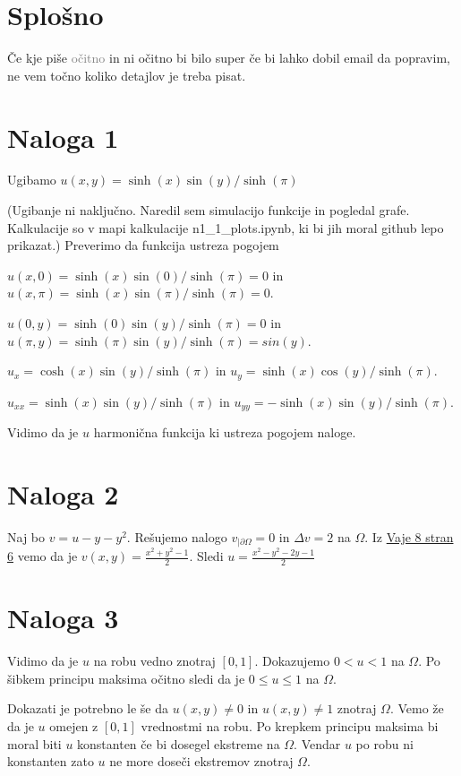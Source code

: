 \documentclass[12pt]{article}
\begin{document}
\section{Splošno}
Če kje piše \textcolor{gray}{očitno} in ni očitno bi bilo super če bi lahko dobil email da popravim, ne vem točno koliko detajlov je treba pisat.


\section{Naloga 1}
Ugibamo $u(x,y) = \sinh(x)\sin(y)/\sinh(\pi )$ 

(Ugibanje ni naključno. Naredil sem simulacijo funkcije in pogledal grafe. Kalkulacije so v mapi kalkulacije n1\_1\_plots.ipynb, ki bi jih moral github lepo prikazat.)
Preverimo da funkcija ustreza pogojem


$u(x,0) = \sinh(x)\sin(0)/\sinh(\pi ) = 0$ in $u(x,\pi) = \sinh(x)\sin(\pi)/\sinh(\pi ) = 0$.


$u(0,y) = \sinh(0)\sin(y)/\sinh(\pi ) = 0$ in $u(\pi,y) = \sinh(\pi)\sin(y)/\sinh(\pi ) = sin(y)$.

$u_x = \cosh(x)\sin(y)/\sinh(\pi )$ in $u_y = \sinh(x)\cos(y)/\sinh(\pi )$.


$u_{xx} = \sinh(x)\sin(y)/\sinh(\pi )$ in $u_{yy} = -\sinh(x)\sin(y)/\sinh(\pi )$.

Vidimo da je $u$ harmonična funkcija ki ustreza pogojem naloge. 

\section{Naloga 2}
Naj bo $v=u-y-y^2$. Rešujemo nalogo $v_{|\partial\Omega}=0$ in $\Delta v=2$ na $\Omega$. Iz \href{https://ucilnica.fmf.uni-lj.si/pluginfile.php/42685/mod_folder/content/0/8Elipt.pdf?forcedownload=1}{Vaje 8 stran 6} vemo da je $v(x,y)=\frac{x^2+y^2-1}{2}$.
Sledi $u=\frac{x^2-y^2-2y-1}{2}$

\section{Naloga 3}
Vidimo da je $u$ na robu vedno znotraj $[0,1]$. Dokazujemo $0<u<1$ na $\Omega$. Po šibkem principu maksima očitno sledi da je
$0\le u\le 1$ na $\Omega$.

Dokazati je potrebno le še da $u(x,y)\neq 0$ in $u(x,y)\neq 1$ znotraj $\Omega$. Vemo že da je $u$ omejen z $[0,1]$ vrednostmi na robu. Po krepkem principu maksima
 bi moral biti $u$ konstanten če bi dosegel ekstreme na $\Omega$. Vendar $u$ po robu ni konstanten zato $u$ ne more doseči ekstremov znotraj $\Omega$.
\end{document}
